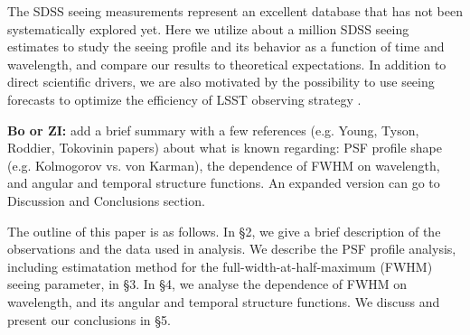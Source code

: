 The SDSS seeing measurements represent an excellent database that has not been systematically 
explored yet. Here we utilize about a million SDSS seeing estimates to study the seeing profile 
and its behavior as a function of time and wavelength, and compare our results to theoretical 
expectations. In addition to direct scientific drivers, we are also motivated by the possibility 
to use seeing forecasts to optimize the efficiency of LSST observing strategy \citep{LSSToverview}.


{\bf Bo or ZI:} add a brief summary with a few references (e.g. Young, Tyson, Roddier,
Tokovinin papers) about what is known regarding:  PSF profile shape (e.g. Kolmogorov vs. von Karman), 
the dependence of FWHM on wavelength, and angular and temporal structure functions. 
An expanded version can go to Discussion and Conclusions section. 


The outline of this paper is as follows. In \S2, we give a brief description of the 
observations and the data used in analysis. We describe the PSF profile analysis, 
including estimatation method for the full-width-at-half-maximum (FWHM) seeing
parameter, in \S3. In \S4, we analyse the dependence of FWHM on wavelength, and its angular 
and temporal structure functions. We discuss and present our conclusions in \S5. 

 